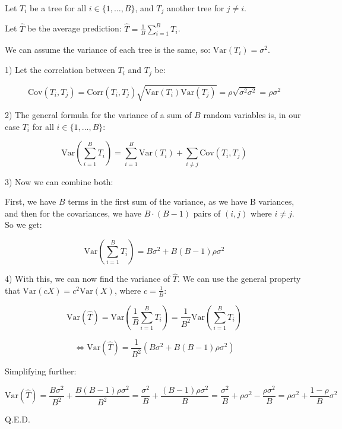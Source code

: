 \begin{answer}
    
    Let $T_i$ be a tree for all $i \in \{1,\ldots,B\}$, and $T_j$ another tree for $j \neq i$.

    Let $\hat{T}$ be the average prediction: $\hat{T} = \frac{1}{B} \sum_{i=1}^B T_i$. 

    We can assume the variance of each tree is the same, so: $\text{Var}(T_i) = \sigma^2$.

    1) Let the correlation between $T_i$ and $T_j$ be:

    $$\text{Cov}(T_i, T_j) = \text{Corr}(T_i, T_j) \sqrt{\text{Var}(T_i)\text{Var}(T_j)} = \rho \sqrt{\sigma^2 \sigma^2} = \rho\sigma^2$$

    2) The general formula for the variance of a sum of $B$ random variables is, in our case $T_i$ for all $i \in \{1,\ldots,B\}$:

    $$\text{Var}\left(\sum_{i=1}^B T_i\right) = \sum_{i=1}^B \text{Var}(T_i) + \sum_{i \neq j} \text{Cov}(T_i, T_j)$$

    3) Now we can combine both:

    First, we have $B$ terms in the first sum of the variance, as we have B variances, and then for the covariances, we have $B \cdot (B-1)$ pairs of $(i,j)$ where $i \neq j$. So we get:

    $$\text{Var}\left(\sum_{i=1}^B T_i\right) = B\sigma^2 + B(B-1)\rho\sigma^2$$

    4) With this, we can now find the variance of $\hat{T}$. We can use the general property that $\text{Var}(cX) = c^2\text{Var}(X)$, where $c = \frac{1}{B}$:

    $$\text{Var}(\hat{T}) = \text{Var}\left(\frac{1}{B}\sum_{i=1}^B T_i\right) = \frac{1}{B^2} \text{Var}\left(\sum_{i=1}^B T_i\right)$$

    $$\Leftrightarrow \text{Var}(\hat{T}) = \frac{1}{B^2} \left( B\sigma^2 + B(B-1)\rho\sigma^2 \right)$$

    Simplifying further:

    $$\text{Var}(\hat{T}) = \frac{B\sigma^2}{B^2} + \frac{B(B-1)\rho\sigma^2}{B^2} = \frac{\sigma^2}{B} + \frac{(B-1)\rho\sigma^2}{B} = \frac{\sigma^2}{B} + \rho\sigma^2 - \frac{\rho\sigma^2}{B} = \rho\sigma^2 + \frac{1-\rho}{B}\sigma^2$$

    Q.E.D.
\end{answer}
